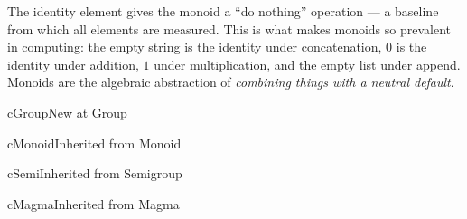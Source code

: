 \begin{remark}
  The identity element gives the monoid a ``do nothing'' operation — a baseline
  from which all elements are measured.  This is what makes monoids so prevalent
  in computing: the empty string is the identity under concatenation, $0$ is the
  identity under addition, $1$ under multiplication, and the empty list under
  append.  Monoids are the algebraic abstraction of \emph{combining things with
  a neutral default}.
\end{remark}



\clearpage\thispagestyle{plain}

\begin{bpnew}{cGroup}{New at Group}
\end{bpnew}

\begin{bpinh}{cMonoid}{Inherited from Monoid}
\end{bpinh}

\begin{bpinh}{cSemi}{Inherited from Semigroup}
\end{bpinh}

\begin{bpinh}{cMagma}{Inherited from Magma}
\end{bpinh}

